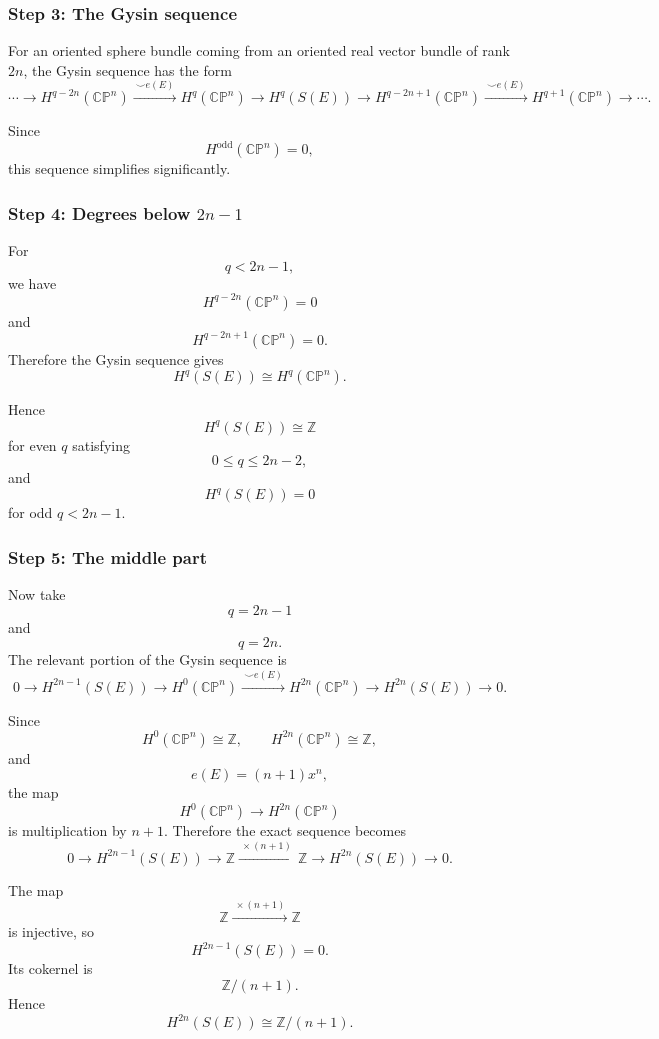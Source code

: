 \documentclass[12pt,a4paper]{article}
\theoremstyle{notespace}
\begin{document}
\subsubsection*{Step 3: The Gysin sequence}

For an oriented sphere bundle coming from an oriented real vector bundle of rank
\(2n\), the Gysin sequence has the form
\[
\cdots
\longrightarrow
H^{q-2n}(\mathbb{CP}^n)
\xrightarrow{\ \smile e(E)\ }
H^q(\mathbb{CP}^n)
\longrightarrow
H^q(S(E))
\longrightarrow
H^{q-2n+1}(\mathbb{CP}^n)
\xrightarrow{\ \smile e(E)\ }
H^{q+1}(\mathbb{CP}^n)
\longrightarrow
\cdots .
\]

Since
\[
H^{\text{odd}}(\mathbb{CP}^n)=0,
\]
this sequence simplifies significantly.

\subsubsection*{Step 4: Degrees below \(2n-1\)}

For
\[
q<2n-1,
\]
we have
\[
H^{q-2n}(\mathbb{CP}^n)=0
\]
and
\[
H^{q-2n+1}(\mathbb{CP}^n)=0.
\]
Therefore the Gysin sequence gives
\[
H^q(S(E))\cong H^q(\mathbb{CP}^n).
\]

Hence
\[
H^q(S(E))\cong \mathbb Z
\]
for even \(q\) satisfying
\[
0\le q\le 2n-2,
\]
and
\[
H^q(S(E))=0
\]
for odd \(q<2n-1\).

\subsubsection*{Step 5: The middle part}

Now take
\[
q=2n-1
\]
and
\[
q=2n.
\]
The relevant portion of the Gysin sequence is
\[
0
\longrightarrow
H^{2n-1}(S(E))
\longrightarrow
H^0(\mathbb{CP}^n)
\xrightarrow{\ \smile e(E)\ }
H^{2n}(\mathbb{CP}^n)
\longrightarrow
H^{2n}(S(E))
\longrightarrow
0.
\]

Since
\[
H^0(\mathbb{CP}^n)\cong \mathbb Z,
\qquad
H^{2n}(\mathbb{CP}^n)\cong \mathbb Z,
\]
and
\[
e(E)=(n+1)x^n,
\]
the map
\[
H^0(\mathbb{CP}^n)\longrightarrow H^{2n}(\mathbb{CP}^n)
\]
is multiplication by \(n+1\). Therefore the exact sequence becomes
\[
0
\longrightarrow
H^{2n-1}(S(E))
\longrightarrow
\mathbb Z
\xrightarrow{\ \times(n+1)\ }
\mathbb Z
\longrightarrow
H^{2n}(S(E))
\longrightarrow
0.
\]

The map
\[
\mathbb Z\xrightarrow{\ \times(n+1)\ }\mathbb Z
\]
is injective, so
\[
H^{2n-1}(S(E))=0.
\]
Its cokernel is
\[
\mathbb Z/(n+1).
\]
Hence
\[
H^{2n}(S(E))\cong \mathbb Z/(n+1).
\]
\end{document}

